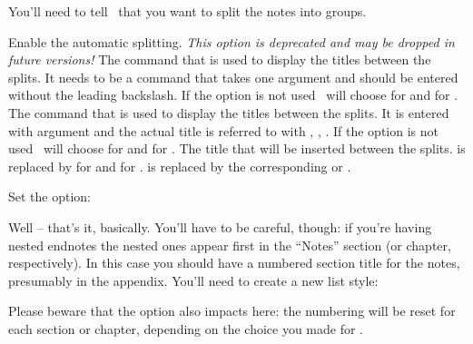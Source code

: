 \documentclass[load-preamble+]{cnltx-doc}
\begin{document}
You'll need to tell \enotez\ that you want to split the notes into groups.
\begin{options}
    Enable the automatic splitting.
  \Default
    \emph{This option is deprecated and may be dropped in future versions!}
    The command that is used to display the titles between the splits.  It
    needs to be a command that takes one argument and should be entered
    without the leading backslash.  If the option is not used \enotez\ will
    choose  for  and 
    for .
    The command that is used to display the titles between
    the splits.  It is entered with argument and the actual title is referred
    to with , \eg,
    .  If the option is
    not used \enotez\ will choose \sarg{} for
     and \sarg{} for
    .
    The title that will be inserted between the splits.   is
    replaced by  for  and 
    for .  is replaced by the corresponding
     or .
\end{options}
Set the  option:
\begin{sourcecode}
\end{sourcecode}
Well -- that's it, basically.  You'll have to be careful, though: if you're
having nested endnotes the nested ones appear first in the ``Notes'' section
(or chapter, respectively).  In this case you should have a numbered section
title for the notes, presumably in the appendix.  You'll need to create a new
list style:
\begin{sourcecode}
  \usepackage{enotez}
  \appendix
  \printendnotes
\end{sourcecode}

Please beware that the option  also impacts here: the numbering
will be reset for each section or chapter, depending on the choice you made
for .
\end{document}
